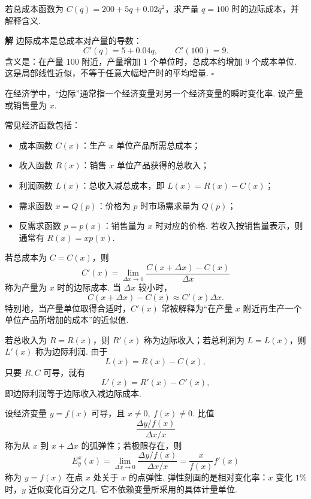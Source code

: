 \documentclass[fontset=fandol]{ctexart}
\newenvironment{solution}{\par\noindent\textbf{解}\quad}{\hfill$\square$\par\vspace{0.8em}}
\begin{document}
\begin{example}[边际成本]
若总成本函数为 $C(q)=200+5q+0.02q^2$，求产量 $q=100$ 时的边际成本，并解释含义.
\end{example}
\begin{solution}
边际成本是总成本对产量的导数：
\[
C'(q)=5+0.04q,\qquad C'(100)=9.
\]
含义是：在产量 $100$ 附近，产量增加 $1$ 个单位时，总成本约增加 $9$ 个成本单位. 这是局部线性近似，不等于任意大幅增产时的平均增量.
\end{solution}

\begin{definition}[边际函数]
在经济学中，“边际”通常指一个经济变量对另一个经济变量的瞬时变化率. 设产量或销售量为 $x$.

常见经济函数包括：
\begin{itemize}[leftmargin=2em]
\item 成本函数 $C(x)$：生产 $x$ 单位产品所需总成本；
\item 收入函数 $R(x)$：销售 $x$ 单位产品获得的总收入；
\item 利润函数 $L(x)$：总收入减总成本，即 $L(x)=R(x)-C(x)$；
\item 需求函数 $x=Q(p)$：价格为 $p$ 时市场需求量为 $Q(p)$；
\item 反需求函数 $p=p(x)$：销售量为 $x$ 时对应的价格. 若收入按销售量表示，则通常有 $R(x)=xp(x)$.
\end{itemize}

若总成本为 $C=C(x)$，则
\[
C'(x)=\lim_{\Delta x\to0}\frac{C(x+\Delta x)-C(x)}{\Delta x}
\]
称为产量为 $x$ 时的边际成本. 当 $\Delta x$ 较小时，
\[
C(x+\Delta x)-C(x)\approx C'(x)\Delta x.
\]
特别地，当产量单位取得合适时，$C'(x)$ 常被解释为“在产量 $x$ 附近再生产一个单位产品所增加的成本”的近似值.

若总收入为 $R=R(x)$，则 $R'(x)$ 称为边际收入；若总利润为 $L=L(x)$，则 $L'(x)$ 称为边际利润. 由于
\[
L(x)=R(x)-C(x),
\]
只要 $R,C$ 可导，就有
\[
L'(x)=R'(x)-C'(x),
\]
即边际利润等于边际收入减边际成本.
\end{definition}

\begin{definition}[弹性]
设经济变量 $y=f(x)$ 可导，且 $x\neq0,\ f(x)\neq0$. 比值
\[
\frac{\Delta y/f(x)}{\Delta x/x}
\]
称为从 $x$ 到 $x+\Delta x$ 的弧弹性；若极限存在，则
\[
E_y^x(x)=\lim_{\Delta x\to0}\frac{\Delta y/f(x)}{\Delta x/x}
=\frac{x}{f(x)}f'(x)
\]
称为 $y=f(x)$ 在点 $x$ 处关于 $x$ 的点弹性. 弹性刻画的是相对变化率：$x$ 变化 $1\%$ 时，$y$ 近似变化百分之几. 它不依赖变量所采用的具体计量单位.
\end{definition}
\end{document}
